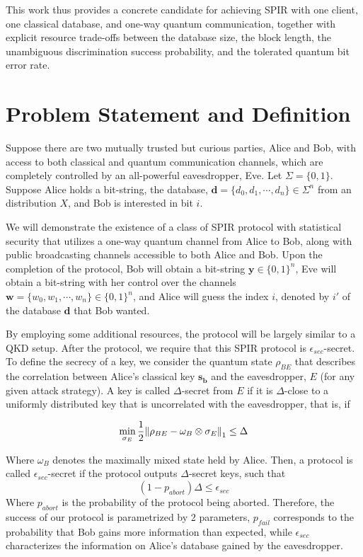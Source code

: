 \documentclass[%
 reprint,
superscriptaddress,
 amsmath,amssymb,
 aps,
]{revtex4-2}
\begin{document}
This work thus provides a concrete candidate for achieving SPIR with one client, one classical database, and one-way quantum communication, together with explicit resource trade-offs between the database size, the block length, the unambiguous discrimination success probability, and the tolerated quantum bit error rate.

\section{Problem Statement and Definition}
\label{sec:formal_definition}

Suppose there are two mutually trusted but curious parties, Alice and Bob, with access to both classical and quantum communication channels, which are completely controlled by an all-powerful eavesdropper, Eve. Let $\Sigma=\{0, 1\}$. Suppose Alice holds a bit-string, the database, $\textbf{d}=\{d_0, d_1, \cdots, d_n\}\in\Sigma^n$ from an distribution $X$, and Bob is interested in bit $i$.

We will demonstrate the existence of a class of SPIR protocol with statistical security that utilizes a one-way quantum channel from Alice to Bob, along with public broadcasting channels accessible to both Alice and Bob. Upon the completion of the protocol, Bob will obtain a bit-string $\mathbf{y} \in \{0, 1\}^n$, Eve will obtain a bit-string with her control over the channels \( \mathbf{w} = \{w_0, w_1, \cdots, w_n\} \in \{0, 1\}^n \), and Alice will guess the index $i$, denoted by $i'$ of the database $\mathbf{d}$ that Bob wanted.

By employing some additional resources, the protocol will be largely similar to a QKD setup. After the protocol, we require that this SPIR protocol is $\epsilon_{sec}$-secret. To define the secrecy of a key, we consider the quantum state $\rho_{BE}$ that describes the correlation between Alice’s classical key $\mathbf{s_b}$ and the eavesdropper, $E$ (for any given attack strategy). A key is called $\Delta$-secret from $E$ if it is $\Delta$-close to a uniformly distributed key that is uncorrelated with the eavesdropper, that is, if

\begin{equation}
    \min_{\sigma_E}\frac{1}{2}\norm{\rho_{BE}-\omega_B\otimes\sigma_E}_1\le\Delta
\end{equation}

Where $\omega_B$ denotes the maximally mixed state held by Alice. Then, a protocol is called $\epsilon_{sec}$-secret if the protocol outputs $\Delta$-secret keys, such that
\begin{equation}
    (1-p_{abort})\Delta \le\epsilon_{sec}
\end{equation}
Where $p_{abort}$ is the probability of the protocol being aborted. Therefore, the success of our protocol is parametrized by 2 parameters, $p_{fail}$ corresponds to the probability that Bob gains more information than expected, while $\epsilon_{sec}$ characterizes the information on Alice's database gained by the eavesdropper.
\end{document}

